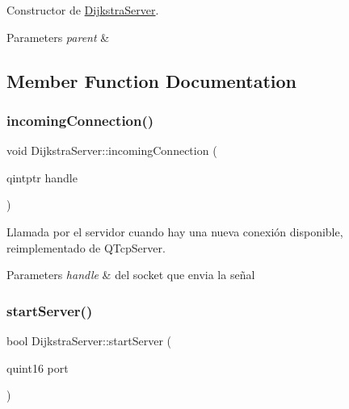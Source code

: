 Constructor de \hyperlink{class_dijkstra_server}{Dijkstra\+Server}. 


\begin{DoxyParams}{Parameters}
{\em parent} & \\
\hline
\end{DoxyParams}


\subsection{Member Function Documentation}
\mbox{\label{class_dijkstra_server_aab86d4d415a39981088e75a140cfd6d4}} 
\subsubsection{\texorpdfstring{incoming\+Connection()}{incomingConnection()}}
{\footnotesize\ttfamily void Dijkstra\+Server\+::incoming\+Connection (\begin{DoxyParamCaption}\item[{qintptr}]{handle }\end{DoxyParamCaption})\hspace{0.3cm}{\ttfamily [protected]}}



Llamada por el servidor cuando hay una nueva conexión disponible, reimplementado de Q\+Tcp\+Server. 


\begin{DoxyParams}{Parameters}
{\em handle} & del socket que envia la señal \\
\hline
\end{DoxyParams}
\mbox{\label{class_dijkstra_server_ad285a85f623398d6feffbfd138e4c76d}} 
\subsubsection{\texorpdfstring{start\+Server()}{startServer()}}
{\footnotesize\ttfamily bool Dijkstra\+Server\+::start\+Server (\begin{DoxyParamCaption}\item[{quint16}]{port }\end{DoxyParamCaption})}



